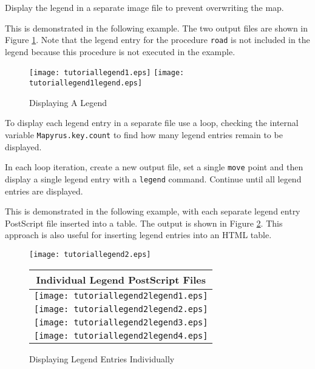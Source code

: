 Display the legend in a separate image file to prevent overwriting the map.

This is demonstrated in the following example.
The two output files are shown in Figure \ref{tutoriallegend1}.
Note that the legend entry for the procedure \texttt{road} is
not included in the legend because this procedure is not
executed in the example.



\begin{figure}[htb]
\texttt{[image: tutoriallegend1.eps]}
\texttt{[image: tutoriallegend1legend.eps]}
\caption{Displaying A Legend}
\label{tutoriallegend1}
\end{figure}

To display each legend entry in a separate file use a loop, checking the
internal variable \texttt{Mapyrus.key.count} to find how many legend entries
remain to be displayed.

In each loop iteration, create a new output file, set a single \texttt{move}
point and then display a single legend entry with a \texttt{legend} command.
Continue until all legend entries are displayed.

This is demonstrated in the following example, with each separate legend entry
PostScript file inserted into a table.  The output is shown in Figure
\ref{tutoriallegend2}.  This approach is also useful for inserting legend
entries into an HTML table.



\begin{figure}[htb]
\texttt{[image: tutoriallegend2.eps]}
\vspace{10pt}

\begin{tabular}{|c|}
\hline
Individual Legend PostScript Files \\
\hline
\texttt{[image: tutoriallegend2legend1.eps]} \\
\hline
\texttt{[image: tutoriallegend2legend2.eps]} \\
\hline
\texttt{[image: tutoriallegend2legend3.eps]} \\
\hline
\texttt{[image: tutoriallegend2legend4.eps]} \\
\hline
\end{tabular}

\caption{Displaying Legend Entries Individually}
\label{tutoriallegend2}
\end{figure}

